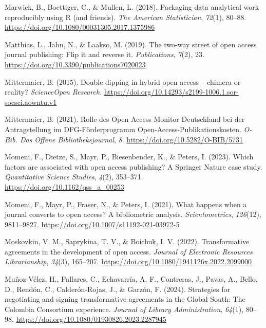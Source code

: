 \documentclass[a4paper,man,floatsintext,longtable,noextraspace,12pt]{apa6}
\newenvironment{CSLReferences}%
  {}%
  {\par}
\begin{document}
\begin{CSLReferences}{1}{0}
\leavevmode{}%
Marwick, B., Boettiger, C., \& Mullen, L. (2018). Packaging data
analytical work reproducibly using {R} (and friends). \emph{The American
Statistician}, \emph{72}(1), 80--88.
\url{https://doi.org/10.1080/00031305.2017.1375986}

\leavevmode{}%
Matthias, L., Jahn, N., \& Laakso, M. (2019). The two-way street of open
access journal publishing: Flip it and reverse it. \emph{Publications},
\emph{7}(2), 23. \url{https://doi.org/10.3390/publications7020023}

\leavevmode{}%
Mittermaier, B. (2015). Double dipping in hybrid open access -- chimera
or reality? \emph{{ScienceOpen} Research}.
\url{https://doi.org/10.14293/s2199-1006.1.sor-socsci.aowntu.v1}

\leavevmode{}%
Mittermaier, B. (2021). {Rolle des Open Access Monitor Deutschland bei
der Antragstellung im DFG-Förderprogramm
Open-Access-Publikationskosten}. \emph{{O-Bib. Das Offene
Bibliotheksjournal}}, \emph{8}. \url{https://doi.org/10.5282/O-BIB/5731}

\leavevmode{}%
Momeni, F., Dietze, S., Mayr, P., Biesenbender, K., \& Peters, I.
(2023). Which factors are associated with open access publishing? A
{Springer Nature} case study. \emph{Quantitative Science Studies},
\emph{4}(2), 353--371. \url{https://doi.org/10.1162/qss_a_00253}

\leavevmode{}%
Momeni, F., Mayr, P., Fraser, N., \& Peters, I. (2021). What happens
when a journal converts to open access? A bibliometric analysis.
\emph{Scientometrics}, \emph{126}(12), 9811--9827.
\url{https://doi.org/10.1007/s11192-021-03972-5}

\leavevmode{}%
Moskovkin, V. M., Saprykina, T. V., \& Boichuk, I. V. (2022).
Transformative agreements in the development of open access.
\emph{Journal of Electronic Resources Librarianship}, \emph{34}(3),
165--207. \url{https://doi.org/10.1080/1941126x.2022.2099000}

\leavevmode{}%
Muñoz-Vélez, H., Pallares, C., Echavarría, A. F., Contreras, J., Pavas,
A., Bello, D., Rendón, C., Calderón-Rojas, J., \& Garzón, F. (2024).
Strategies for negotiating and signing transformative agreements in the
{Global South}: The {Colombia Consortium} experience. \emph{Journal of
Library Administration}, \emph{64}(1), 80--98.
\url{https://doi.org/10.1080/01930826.2023.2287945}


\end{CSLReferences}
\end{document}
